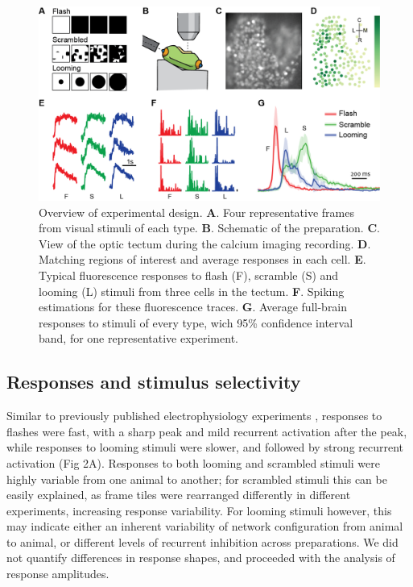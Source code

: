 \documentclass{article}
\begin{document}
\begin{figure}
\includegraphics[width=\linewidth]{fig1.png}
\caption{
Overview of experimental design. \textbf{A}. Four representative frames from visual stimuli of each type. \textbf{B}. Schematic of the preparation. \textbf{C}. View of the optic tectum during the calcium imaging recording. \textbf{D}. Matching regions of interest and average responses in each cell. \textbf{E}. Typical fluorescence responses to flash (F), scramble (S) and looming (L) stimuli from three cells in the tectum. \textbf{F}. Spiking estimations for these fluorescence traces. \textbf{G}. Average full-brain responses to stimuli of every type, wich 95\% confidence interval band, for one representative experiment. }
\end{figure}

\subsection*{Responses and stimulus selectivity}

Similar to previously published electrophysiology experiments \citep{khakhalin2014}, responses to flashes were fast, with a sharp peak and mild recurrent activation after the peak, while responses to looming stimuli were slower, and followed by strong recurrent activation (Fig 2A). Responses to both looming and scrambled stimuli were highly variable from one animal to another; for scrambled stimuli this can be easily explained, as frame tiles were rearranged differently in different experiments, increasing response variability. For looming stimuli however, this may indicate either an inherent variability of network configuration from animal to animal, or different levels of recurrent inhibition across preparations. We did not quantify differences in response shapes, and proceeded with the analysis of response amplitudes.
\end{document}
